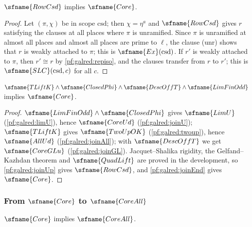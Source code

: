 \begin{lemma}\label{pf:galred:joinEnd}
$\sfname{RowCsd}$ implies $\sfname{Core}$.
\end{lemma}

\begin{proof}
Let $(\pi,\chi)$ be in scope $\mathrm{csd}$; then $\chi=\eta^a$ and $\sfname{RowCsd}$ gives $r$ satisfying the clauses at all
places where $\pi$ is unramified. Since $\pi$ is unramified at almost all places and almost all places are prime to $\ell$, the
clause (unr) shows that $r$ is weakly attached to $\pi$; this is $\sfname{Ex}(\mathrm{csd})$. If $r'$ is weakly attached to
$\pi$, then $r'\cong r$ by \cref{pf:galred:repiso}, and the clauses transfer from $r$ to $r'$; this is
$\sfname{SLC}(\mathrm{csd},c)$ for all $c$.
\end{proof}

\begin{theorem}\label{pf:galred:toCoreK}
$\sfname{TLiftK}\wedge\sfname{ClosedPhi}\wedge\sfname{DescOffT}\wedge\sfname{LimFinOdd}$ implies $\sfname{Core}$.
\end{theorem}

\begin{proof}
$\sfname{LimFinOdd}\wedge\sfname{ClosedPhi}$ gives $\sfname{LimU}$ (\cref{pf:galred:limU}), hence $\sfname{CoreUd}$
(\cref{pf:galred:joinU}); $\sfname{TLiftK}$ gives $\sfname{TwoUpOK}$ (\cref{pf:galred:twoup}), hence $\sfname{AllUd}$
(\cref{pf:galred:joinAll}); with $\sfname{DescOffT}$ we get $\sfname{CoreGLu}$ (\cref{pf:galred:joinGL}). Jacquet--Shalika
rigidity, the Gelfand--Kazhdan theorem \cite{JacquetShalika1981,GelfandKazhdan1975} and $\sfname{QuadLift}$ are proved in the
development, so \cref{pf:galred:joinUp} gives $\sfname{RowCsd}$, and \cref{pf:galred:joinEnd} gives $\sfname{Core}$.
\end{proof}

\subsubsection{From \texorpdfstring{$\sfname{Core}$}{Core} to \texorpdfstring{$\sfname{CoreAll}$}{CoreAll}}

\begin{theorem}\label{pf:galred:coreallofcore}
$\sfname{Core}$ implies $\sfname{CoreAll}$.
\end{theorem}

